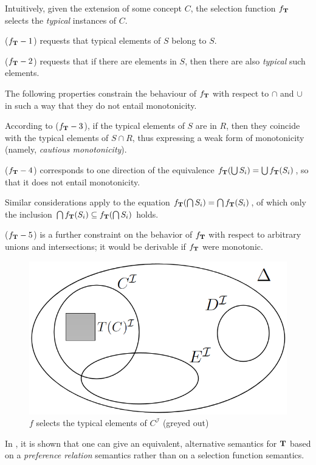 \documentclass[a4paper, 11pt, oneside]{duthesis}
\newcommand{\tip}{{\bf T}}
\newcommand{\incluso} {\subseteq}
\begin{document}
\noindent Intuitively, given the extension of some concept $C$, the selection function $f_\tip$ selects  the {\em typical} instances of $C$.

($f_\tip-1$) requests that typical elements of $S$ belong to $S$.

($f_\tip-2$) requests that if there are elements in $S$, then there are also {\em typical} such elements.

The following properties constrain the behaviour of $f_\tip$ with respect to $\cap$ and $\cup$ in such a way that they do not entail monotonicity.

According to ($f_\tip-3$), if the typical elements of $S$ are in $R$, then they coincide with the typical elements of $S \cap R$, thus expressing a weak form of monotonicity (namely, {\em cautious monotonicity}).

($f_\tip-4$) corresponds to one direction of the equivalence $f_\tip(\bigcup S_i) = \bigcup f_\tip(S_i)$, so that it does not entail monotonicity.

Similar considerations apply to the equation $f_\tip(\bigcap S_i) = \bigcap f_\tip(S_i)$, of which only the inclusion $\bigcap f_\tip(S_i) \incluso f_\tip(\bigcap S_i)$ holds.

($f_\tip-5$) is a further constraint on the behavior of $f_\tip$ with respect to arbitrary unions and intersections; it would be derivable if $f_\tip$ were monotonic.

\begin{figure}[H]
\centering
\includegraphics[scale=0.40]{img/diagram1_8.png}
\caption{$f$ selects the typical elements of $C^\mathcal{I}$ (greyed out)}
\label{}
\end{figure}

In \cite{FI09}, it is shown that one can give an equivalent, alternative semantics for $\tip$ based on a \emph{preference relation} semantics rather than on a selection function semantics.
\end{document}
